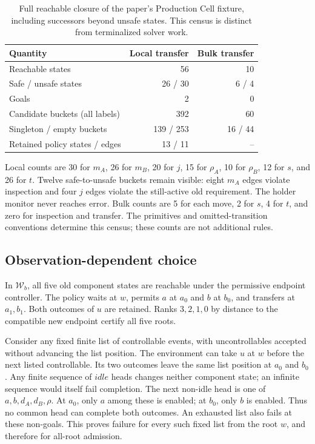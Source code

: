 \documentclass[11pt]{article}
\begin{document}
\begin{table}[ht]
\centering\small
\caption{Full reachable closure of the paper's Production Cell fixture, including successors beyond unsafe states. This census is distinct from terminalized solver work.}
\begin{tabular}{@{}lrr@{}}
\toprule
Quantity & Local transfer & Bulk transfer\\
\midrule
Reachable states & 56 & 10\\
Safe / unsafe states & 26 / 30 & 6 / 4\\
Goals & 2 & 0\\
Candidate buckets (all labels) & 392 & 60\\
Singleton / empty buckets & 139 / 253 & 16 / 44\\
Retained policy states / edges & 13 / 11 & --\\
\bottomrule
\end{tabular}
\end{table}
Local counts are 30 for $m_A$, 26 for $m_B$, 20 for $j$, 15 for $\rho_A$, 10 for $\rho_B$, 12 for $s$, and 26 for $t$. Twelve safe-to-unsafe buckets remain visible: eight $m_A$ edges violate inspection and four $j$ edges violate the still-active old requirement. The holder monitor never reaches error. Bulk counts are 5 for each move, 2 for $s$, 4 for $t$, and zero for inspection and transfer. The primitives and omitted-transition conventions determine this census; these counts are not additional rules.

\subsection{Observation-dependent choice}
In $\mathcal W_b$, all five old component states are reachable under the permissive endpoint controller. The policy waits at $w$, permits $a$ at $a_0$ and $b$ at $b_0$, and transfers at $a_1,b_1$. Both outcomes of $u$ are retained. Ranks $3,2,1,0$ by distance to the compatible new endpoint certify all five roots.

Consider any fixed finite list of controllable events, with uncontrollables accepted without advancing the list position. The environment can take $u$ at $w$ before the next listed controllable. Its two outcomes leave the same list position at $a_0$ and $b_0$. Any finite sequence of $idle$ heads changes neither component state; an infinite sequence would itself fail completion. The next non-idle head is one of $a,b,d_A,d_B,\rho$. At $a_0$, only $a$ among these is enabled; at $b_0$, only $b$ is enabled. Thus no common head can complete both outcomes. An exhausted list also fails at these non-goals. This proves failure for every such fixed list from the root $w$, and therefore for all-root admission.
\end{document}
